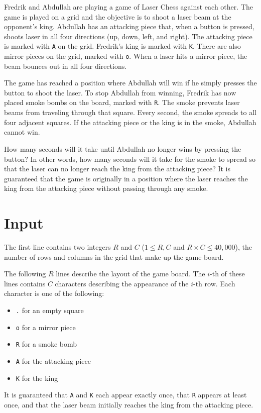 \noindent
Fredrik and Abdullah are playing a game of Laser Chess against each other. The game is played on a grid and the objective is to shoot a laser beam at the opponent's king.
Abdullah has an attacking piece that, when a button is pressed, shoots laser in all four directions (up, down, left, and right).
The attacking piece is marked with \texttt{A} on the grid.
Fredrik's king is marked with \texttt{K}. There are also mirror pieces on the grid, marked with \texttt{o}.
When a laser hits a mirror piece, the beam bounces out in all four directions.

The game has reached a position where Abdullah will win if he simply presses the button to shoot the laser.
To stop Abdullah from winning, Fredrik has now placed smoke bombs on the board, marked with \texttt{R}.
The smoke prevents laser beams from traveling through that square. Every second, the smoke spreads to all four adjacent squares.
If the attacking piece or the king is in the smoke, Abdullah cannot win.

How many seconds will it take until Abdullah no longer wins by pressing the button?
In other words, how many seconds will it take for the smoke to spread so that the laser can no longer reach the king from the attacking piece?
It is guaranteed that the game is originally in a position where the laser reaches the king from the attacking piece without passing through any smoke.

\section*{Input}
The first line contains two integers $R$ and $C$ ($1 \le R, C$ and $R \times C \le 40,000$), the number of rows and columns in the grid that make up the game board.

The following $R$ lines describe the layout of the game board.
The $i$-th of these lines contains $C$ characters describing the appearance of the $i$-th row.
Each character is one of the following:
\begin{itemize}
    \item \texttt{.} for an empty square
    \item \texttt{o} for a mirror piece
    \item \texttt{R} for a smoke bomb
    \item \texttt{A} for the attacking piece
    \item \texttt{K} for the king
\end{itemize}
It is guaranteed that \texttt{A} and \texttt{K} each appear exactly once,
that \texttt{R} appears at least once,
and that the laser beam initially reaches the king from the attacking piece.

